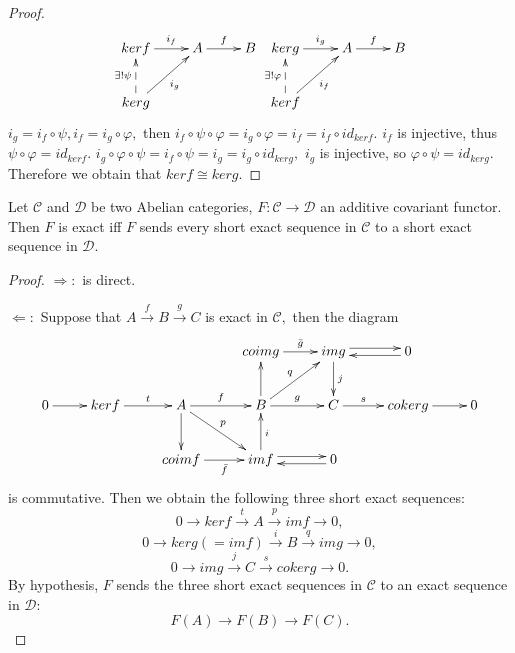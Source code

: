 \begin{proof}
\[ \xymatrix{
   kerf \ar[r]^-{i_f} & A \ar[r]^-f & B          \\
   kerg \ar[ur]_{i_g} \ar@{-->}[u]^{\exists!\psi} }
   \xymatrix{
   kerg \ar[r]^-{i_g} & A \ar[r]^-f & B             \\
   kerf \ar[ur]_{i_f} \ar@{-->}[u]^{\exists!\varphi} }
\]
$i_g=i_f\circ\psi, i_f=i_g\circ\varphi,$ then
$i_f\circ\psi\circ\varphi=i_g\circ\varphi=i_f=i_f\circ id_{kerf}.$
$i_f$ is injective, thus $\psi\circ\varphi=id_{kerf}.$
$i_g\circ\varphi\circ\psi=i_f\circ\psi=i_g=i_g\circ id_{kerg},$
$i_g$ is injective, so $\varphi\circ\psi=id_{kerg}.$ Therefore we
obtain that $kerf\cong kerg.$
\end{proof}
\begin{prop}
Let $\mathscr{C}$ and $\mathscr{D}$ be two Abelian categories,
$F:\mathscr{C}\rightarrow \mathscr{D}$ an additive covariant
functor. Then $F$ is exact iff $F$ sends every short exact sequence
in $\mathscr{C}$ to a short exact sequence in $\mathscr{D}.$
\end{prop}
\begin{proof}
$\Longrightarrow:$ is direct.

$\Longleftarrow:$ Suppose that $A\stackrel{f}{\rightarrow}
B\stackrel{g}{\rightarrow} C$ is exact in $\mathscr{C},$ then the
diagram
\[ \xymatrix{
   & & & coimg \ar[r]^-{\bar{g}} & img \ar@<.6ex>[r] \ar[d]^j & 0
   \ar@<.6ex>[l]                                               \\
   0 \ar[r] & kerf\ar[r]^-t & A \ar[r]^-f \ar[d] \ar[dr]^-p & B
   \ar[u] \ar[r]^-g \ar[ur]^-q & C \ar[r]^-s & cokerg \ar[r] &0 \\
   & & coimf\ar[r]_-{\bar{f}} & imf \ar[u]_i \ar@<.6ex>[r] & 0
   \ar@<.6ex>[l] }  \]
is commutative. Then we obtain the following three short exact
sequences:
$$0\rightarrow kerf\stackrel{t}{\rightarrow} A\stackrel{p}{\rightarrow} imf\rightarrow 0,$$
$$0\rightarrow kerg(=imf)\stackrel{i}{\rightarrow} B\stackrel{q}{\rightarrow} img\rightarrow 0,$$
$$0\rightarrow img\stackrel{j}{\rightarrow} C\stackrel{s}{\rightarrow} cokerg\rightarrow 0.$$
By hypothesis, $F$ sends the three short exact sequences in
$\mathscr{C}$ to an exact sequence in $\mathscr{D}:$
$$F(A)\rightarrow F(B)\rightarrow F(C).$$
\end{proof}
